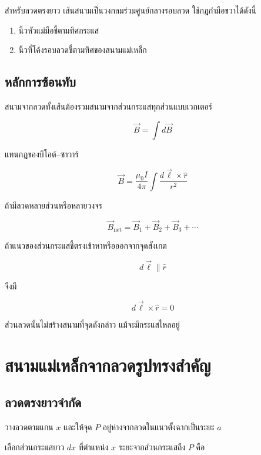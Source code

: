 สำหรับลวดตรงยาว เส้นสนามเป็นวงกลมร่วมศูนย์กลางรอบลวด ใช้กฎกำมือขวาได้ดังนี้

\begin{enumerate}
    \item นิ้วหัวแม่มือชี้ตามทิศกระแส
    \item นิ้วที่โค้งรอบลวดชี้ตามทิศของสนามแม่เหล็ก
\end{enumerate}

\subsection{หลักการซ้อนทับ}

สนามจากลวดทั้งเส้นต้องรวมสนามจากส่วนกระแสทุกส่วนแบบเวกเตอร์

\[
\vec{B}=\int d\vec{B}
\]

แทนกฎของบิโอต์--ซาวาร์

\begin{tcolorbox}[title={สนามจากการกระจายกระแสต่อเนื่อง}]
\[
\boxed{
\vec{B}
=
\frac{\mu_0 I}{4\pi}
\int
\frac{d\vec{\ell}\times\hat{r}}{r^2}}
\]
\end{tcolorbox}

ถ้ามีลวดหลายส่วนหรือหลายวงจร

\[
\boxed{
\vec{B}_{\text{net}}
=
\vec{B}_1+\vec{B}_2+\vec{B}_3+\cdots}
\]

\begin{tcolorbox}[title={ส่วนลวดที่ให้สนามเป็นศูนย์ ณ จุดสังเกต}]
ถ้าแนวของส่วนกระแสชี้ตรงเข้าหาหรือออกจากจุดสังเกต

\[
d\vec{\ell}\parallel\hat{r}
\]

จึงมี

\[
d\vec{\ell}\times\hat{r}=0
\]

ส่วนลวดนั้นไม่สร้างสนามที่จุดดังกล่าว แม้จะมีกระแสไหลอยู่
\end{tcolorbox}

\section{สนามแม่เหล็กจากลวดรูปทรงสำคัญ}

\subsection{ลวดตรงยาวจำกัด}

วางลวดตามแกน $x$ และให้จุด $P$ อยู่ห่างจากลวดในแนวตั้งฉากเป็นระยะ $a$

เลือกส่วนกระแสยาว $dx$ ที่ตำแหน่ง $x$ ระยะจากส่วนกระแสถึง $P$ คือ

